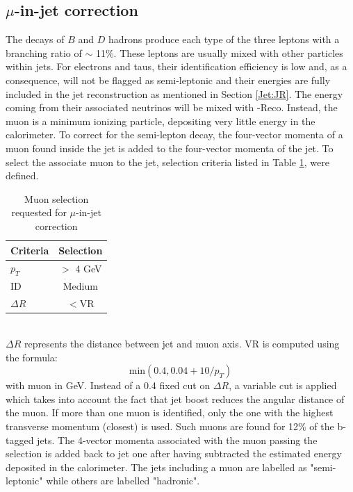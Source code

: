 \subsection{$\mu$-in-jet correction}
\label{Jet:Cal:BCal:MuInJet}
The decays of $B$ and $D$ hadrons produce each type of the three leptons with a branching ratio of $\sim$ 11\%. These leptons are usually mixed with other particles within jets. For electrons and taus, their identification efficiency is low and, as a consequence, will not be flagged as semi-leptonic and their energies are fully included in the jet reconstruction as mentioned in Section \ref{Jet:JR}. The energy coming from their associated neutrinos will be mixed with \pT-Reco. Instead, the muon is a minimum ionizing particle, depositing very little energy in the calorimeter. To correct for the semi-lepton decay, the four-vector momenta of a muon found inside the jet is added to the four-vector momenta of the jet. To select the associate muon to the jet, selection criteria listed in Table \ref{tab:Jet:Cal:BCal:MuInJet:Sel}, were defined.
\begin{table}[htbp]
    \centering
    \begin{tabular}{lc}
       \hline\hline
        Criteria & Selection \\
        \hline
        $p_T$ & $>$ 4 GeV \\
         ID & Medium \\
         $\Delta R$ &  $<$VR\\
         \hline
         \hline
    \end{tabular}
    \caption{Muon selection requested for $\mu$-in-jet correction}
    \label{tab:Jet:Cal:BCal:MuInJet:Sel}
\end{table}
\\
$\Delta R$ represents the distance between jet and muon axis. VR is computed using the formula:
\begin{equation}
    \mathrm{min}(0.4, 0.04+10/p_T)
\end{equation}
with muon \pT in GeV. Instead of a 0.4 fixed cut on $\Delta R$, a variable cut is applied which takes into account the fact that jet boost reduces the angular distance of the muon. If more than one muon is identified, only the one with the highest transverse momentum (closest) is used. Such muons are found for 12\% of the b-tagged jets. The 4-vector momenta associated with the muon passing the selection is added back to jet one after having subtracted the estimated energy deposited in the calorimeter. The jets including a muon are labelled as "semi-leptonic" while others are labelled "hadronic".

